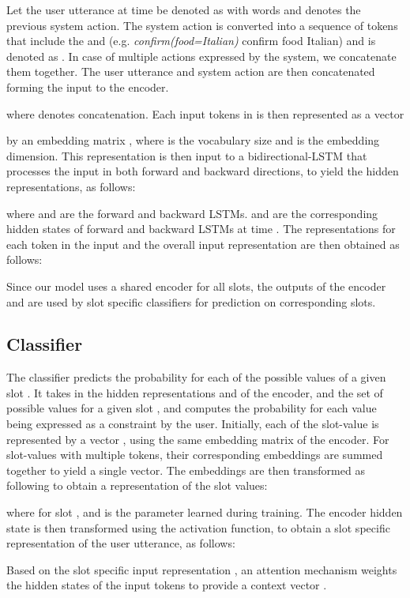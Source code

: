 \documentclass{article}
\begin{document}
Let the user utterance at time  be denoted as  with  words and  denotes the previous system action.
The system action  is converted into a sequence of tokens that include the  and  (e.g. \textit{confirm(food=Italian)}  confirm food Italian) and is denoted as .
In case of multiple actions expressed by the system, we concatenate them together.
The user utterance  and system action  are then concatenated forming the input  to the encoder.

where  denotes concatenation.
Each input tokens in  is then represented as a vector 
 
by an embedding matrix ,
where  is the vocabulary size and  is the embedding dimension.
This representation is then input to a bidirectional-LSTM \cite{hochreiter1997long} that processes the input in both forward and backward directions, to yield the hidden representations, as follows:

where  and  are the forward and backward LSTMs.  and  are the corresponding hidden states of forward and backward LSTMs at time .
The representations  for each token in the input and the overall input representation  are then obtained as follows:


Since our model uses a shared encoder for all slots, the outputs of the encoder  and  are used by slot specific classifiers for prediction on corresponding slots.

\subsection{Classifier}
The classifier predicts the probability for each of the possible values   of a given slot .
It takes in the hidden representations  and  of the encoder, and the set of possible values  for a given slot , and computes the probability for each value being expressed as a constraint by the user.
Initially, each of the slot-value is represented by a vector , using the same embedding matrix  of the encoder.
For slot-values with multiple tokens, their corresponding embeddings are summed together to yield a single vector.
The embeddings are then transformed as following to obtain a representation of the slot values:

where  for slot , and  is the parameter learned during training.
The encoder hidden state  is then transformed using the  activation function, to obtain a slot specific representation of the user utterance, as follows:


Based on the slot specific input representation , an attention mechanism weights the hidden states of the input tokens  to provide a context vector .
\end{document}
